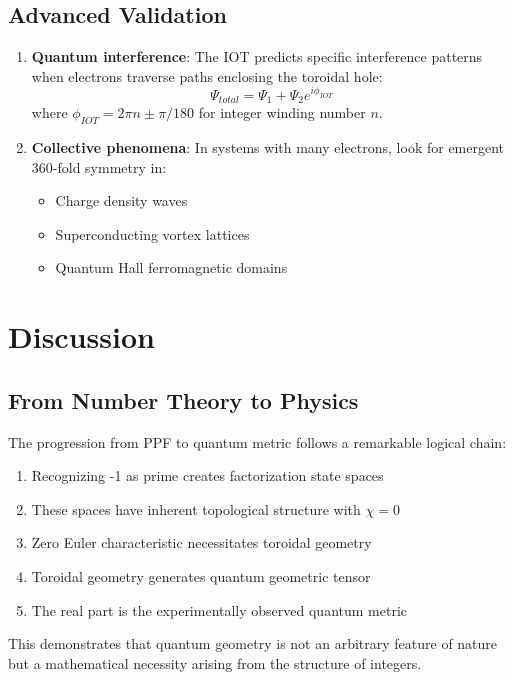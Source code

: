 \documentclass[conference]{IEEEtran}
\begin{document}
\subsection{Advanced Validation}
\begin{enumerate}
\item \textbf{Quantum interference}: The IOT predicts specific interference patterns when electrons traverse paths enclosing the toroidal hole:
\begin{equation}
\Psi_{total} = \Psi_1 + \Psi_2 e^{i\phi_{IOT}}
\end{equation}
where $\phi_{IOT} = 2\pi n \pm \pi/180$ for integer winding number $n$.

\item \textbf{Collective phenomena}: In systems with many electrons, look for emergent 360-fold symmetry in:
\begin{itemize}
\item Charge density waves
\item Superconducting vortex lattices  
\item Quantum Hall ferromagnetic domains
\end{itemize}
\end{enumerate}

\section{Discussion}

\subsection{From Number Theory to Physics}

The progression from PPF to quantum metric follows a remarkable logical chain:

\begin{enumerate}
\item Recognizing -1 as prime creates factorization state spaces
\item These spaces have inherent topological structure with $\chi = 0$
\item Zero Euler characteristic necessitates toroidal geometry
\item Toroidal geometry generates quantum geometric tensor
\item The real part is the experimentally observed quantum metric
\end{enumerate}

This demonstrates that quantum geometry is not an arbitrary feature of nature but a mathematical necessity arising from the structure of integers.
\end{document}
